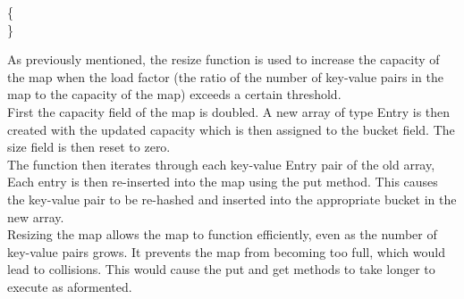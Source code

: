\documentclass[a4paper]{article}
\begin{document}
\vspace{4mm}
\makeatletter
\renewcommand{\ALG@name}{Hashmap Method}
\makeatother

\begin{algorithm}
\caption{}\label{euclid}
\begin{algorithmic}[1]

\algrenewcommand{}
 {\{ }
\State{}
\State\quad{}
\State\quad{}
\State\quad{\tt \} }
\State{\tt \} } \\
{\}}


\EndProcedure
\end{algorithmic}
\end{algorithm}




As previously mentioned, the resize function is used to increase the capacity of the map when the load factor
(the ratio of the number of key-value pairs in the map to the capacity of the map) exceeds a certain threshold. \\

First the capacity field of the map is doubled. 
A new array of type Entry is then created with the updated capacity
which is then assigned to the bucket field. 
The size field is then reset to zero. \\

The function then iterates through each key-value Entry pair of the old array,
Each entry is then re-inserted into the map using the put method.
This causes the key-value pair to be re-hashed and inserted into the appropriate bucket in the new array. \\

Resizing the map allows the map to function efficiently, 
even as the number of key-value pairs grows. 
It prevents the map from becoming too full,
which would lead to collisions.
This would cause the put and get methods to take longer to execute as aformented.


\vspace{4mm}
\pagebreak




\end{document}
